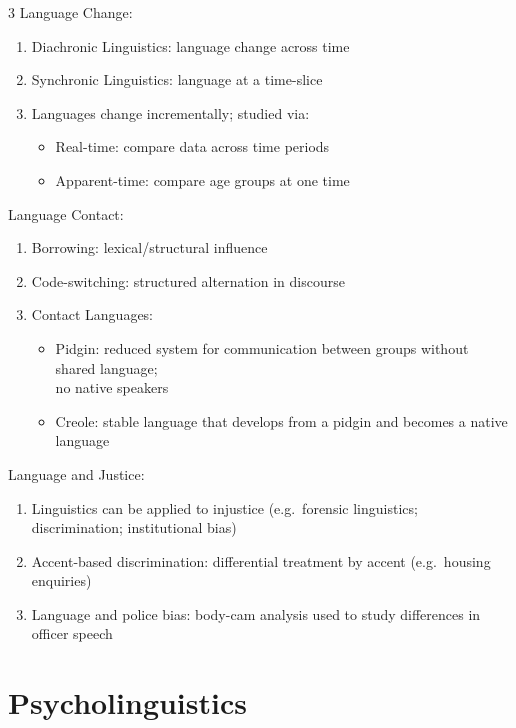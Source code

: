 \documentclass[12pt, a4paper]{article}
\begin{document}
\begin{multicols*}{3}
Language Change:
\begin{enumerate}[\roman*.]
  \item Diachronic Linguistics: language change across time
  \item Synchronic Linguistics: language at a time-slice
  \item Languages change incrementally; studied via:
    \begin{itemize}[leftmargin=*]\vspace{3pt}
      \item Real-time: compare data across time periods
      \item Apparent-time: compare age groups at one time
    \end{itemize}
\end{enumerate}

Language Contact:
\begin{enumerate}[\roman*.]
  \item Borrowing: lexical/structural influence
  \item Code-switching: structured alternation in discourse
  \item Contact Languages:
    \begin{itemize}[leftmargin=*]\vspace{3pt}
      \item Pidgin: reduced system for communication between groups without shared language;\\no native speakers
      \item Creole: stable language that develops from a pidgin and becomes a native language
    \end{itemize}
\end{enumerate}

Language and Justice:
\begin{enumerate}[\roman*.]
  \item Linguistics can be applied to injustice (e.g.\ forensic linguistics; discrimination; institutional bias)
  \item Accent-based discrimination: differential treatment by accent (e.g.\ housing enquiries)
  \item Language and police bias: body-cam analysis used to study differences in officer speech
\end{enumerate}
\colbreak
\colbreak
\section{Psycholinguistics}


\end{multicols*}
\end{document}
